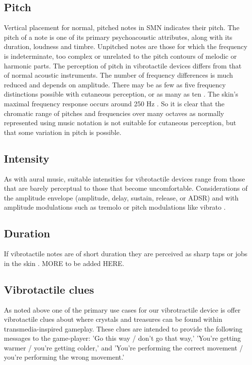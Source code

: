 \documentclass[a4paper, twocolumn]{article}
\begin{document}
\subsection{Pitch}
Vertical placement for normal, pitched notes in SMN indicates their pitch. The pitch of a note is one of its primary psychoacoustic attributes, along with its duration, loudness and timbre. Unpitched notes are those for which the frequency is indeterminate, too complex or unrelated to the pitch contours of melodic or harmonic parts. The perception of pitch in vibrotactile devices differs from that of normal acoustic instruments. The number of frequency differences is much reduced and depends on amplitude. There may be as few as five frequency distinctions possible with cutaneous perception, or as many as ten \cite{van2003distilling}. The skin's maximal frequency response occurs around 250 Hz \cite{gunther2003cutaneous}. So it is clear that the chromatic range of pitches and frequencies over many octaves as normally represented using music notation is not suitable for cutaneous perception, but that some variation in pitch is possible. 

\subsection{Intensity}
As with aural music, suitable intensities for vibrotactile devices range from those that are barely perceptual to those that become uncomfortable. Considerations of the amplitude envelope (amplitude, delay, sustain, release, or ADSR) and with amplitude modulations such as tremolo or pitch modulations like vibrato \cite{gunther2003cutaneous}. 

\subsection{Duration}
If vibrotactile notes are of short duration they are perceived as sharp taps or jobs in the skin \cite{gunther2003cutaneous}. MORE to be added HERE.

\subsection{Vibrotactile clues}
As noted above one of the primary use cases for our vibrotractile device is offer vibrotactile clues about where crystals and treasures can be found within transmedia-inspired gameplay. These clues are intended to provide the following messages to the game-player: 'Go this way / don't go that way,'
'You're getting warmer / you're getting colder,' and 
'You're performing the correct movement / you're performing the wrong movement.'\\
\end{document}
